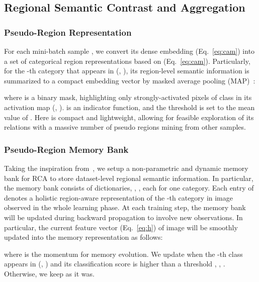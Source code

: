 \documentclass[10pt,twocolumn,letterpaper]{article}
\begin{document}
\subsection{Regional Semantic Contrast and Aggregation}

\subsubsection{Pseudo-Region Representation}\label{sec:prr}

For each mini-batch sample , we convert its dense embedding  (Eq.~\ref{eq:cam}) into a set of categorical region representations based on  (Eq.~\ref{eq:cam}). Particularly, for the -th category that appears in  (\ie, ), its region-level semantic information is summarized to a compact embedding vector  by masked average pooling (MAP)~\cite{siam2019amp}:
\vspace{-3pt}

where  is a binary mask, highlighting only strongly-activated pixels of class  in its activation map (\ie, ).  is an indicator function, and the threshold  is set to the mean value of . Here  is compact and lightweight, allowing for  feasible exploration of its relations with a massive number of pseudo regions mining from other samples.



\subsubsection{Pseudo-Region Memory Bank}\label{sec:memorybank}
Taking the inspiration from~\cite{xiao2017joint,wu2018unsupervised}, we setup a non-parametric and dynamic memory bank for RCA to store dataset-level regional semantic information. In particular, the memory bank  consists of  dictionaries,  \ie, , each for one category. Each  entry of  denotes a holistic region-aware representation   of the -th category in image  observed in the whole learning phase. At each training step, the memory bank will be  updated during backward propagation to involve new observations. In particular, the current feature vector  (Eq.~\ref{eq:h}) of image  will be smoothly updated into the memory representation  as follows:
\vspace{-3pt}

where  is the momentum for memory evolution.  We update  when the -th class appears in  (\ie, ) and its classification score is higher than a threshold , \ie, . Otherwise, we keep  as it was.
\end{document}
